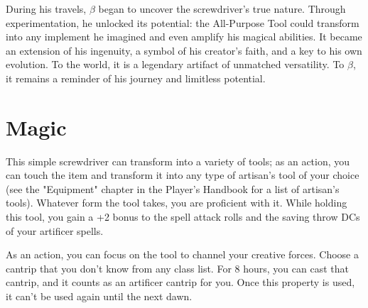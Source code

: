 During his travels, $\beta$ began to uncover the screwdriver's true nature. Through experimentation, he unlocked its potential: the All-Purpose Tool could transform into any implement he imagined and even amplify his magical abilities. It became an extension of his ingenuity, a symbol of his creator's faith, and a key to his own evolution. To the world, it is a legendary artifact of unmatched versatility. To $\beta$, it remains a reminder of his journey and limitless potential.

\section*{Magic}
This simple screwdriver can transform into a variety of tools; as an action, you can touch the item and transform it into any type of artisan's tool of your choice (see the "Equipment" chapter in the Player's Handbook for a list of artisan's tools). Whatever form the tool takes, you are proficient with it. While holding this tool, you gain a +2 bonus to the spell attack rolls and the saving throw DCs of your artificer spells.

As an action, you can focus on the tool to channel your creative forces. Choose a cantrip that you don't know from any class list. For 8 hours, you can cast that cantrip, and it counts as an artificer cantrip for you. Once this property is used, it can't be used again until the next dawn.